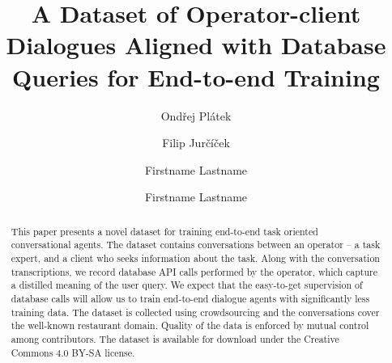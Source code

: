 \documentclass[runningheads,a4paper]{llncs}
\def\OP#1{#1}  %
\begin{document}


\title{A Dataset of Operator-client Dialogues Aligned with Database Queries for End-to-end Training}

\author{Ondřej Plátek \and Filip Jurčíček}

\iftrue %
\author{Firstname Lastname \and Firstname Lastname }
\fi
			
\maketitle

\begin{abstract}
This paper presents a novel dataset for training end-to-end task oriented conversational agents.
The dataset contains conversations between an operator – a task expert, and a client who seeks information about the task.
Along with the conversation transcriptions, we record database API calls performed by the operator, which capture a distilled meaning of the user query.
We expect that the easy-to-get supervision of database calls will allow us to train end-to-end dialogue agents with significantly less training data.
The dataset is collected using crowdsourcing and the conversations cover the well-known restaurant domain.
Quality of the data is enforced by mutual control among contributors.  
The dataset is available for download under the Creative Commons 4.0 BY-SA license.
\end{abstract}

\vspace{-1.00em}
\vspace{-1.00em}
\end{document}

